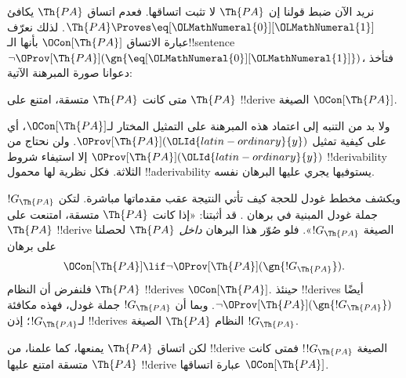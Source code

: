 \documentclass[../../../include/open-logic-section]{subfiles}
\begin{document}


نريد الآن ضبط قولنا إن $\Th{PA}$ لا تثبت اتساقها.
فعدم اتساق $\Th{PA}$ يكافئ $\Th{PA} \Proves \eq[\OLMathNumeral{0}][\OLMathNumeral{1}]$.
لذلك نعرّف عبارة الاتساق $\OCon[\Th{PA}]$ بأنها
الـ!!{sentence} $\lnot
\OProv[\Th{PA}](\gn{\eq[\OLMathNumeral{0}][\OLMathNumeral{1}]})$، فتأخذ دعوانا صورة المبرهنة
الآتية:

\begin{thm}
متى كانت $\Th{PA}$ متسقة، امتنع على $\Th{PA}$ !!{derive}
الصيغة $\OCon[\Th{PA}]$.
\end{thm}

ولا بد من التنبه إلى اعتماد هذه المبرهنة على التمثيل المختار
لـ$\OCon[\Th{PA}]$، أي على كيفية تمثيل $\OProv[\Th{PA}](\OLId{latin-ordinary}{y})$.
ولن نحتاج من $\OProv[\Th{PA}](\OLId{latin-ordinary}{y})$ إلا استيفاء شروط
!!{derivability} الثلاثة. فكل نظرية لها محمول
!!a{derivability} يستوفيها يجري عليها البرهان نفسه.

ويكشف مخطط غودل للحجة كيف تأتي النتيجة عقب مقدماتها مباشرة.
لتكن $!G_\Th{PA}$ جملة غودل المبنية في برهان
. قد أثبتنا: «إذا كانت
$\Th{PA}$ متسقة، امتنعت على $\Th{PA}$ !!{derive} الصيغة
$!G_\Th{PA}$». فلو صُوّر هذا البرهان \emph{داخل} $\Th{PA}$
لحصلنا على برهان
\[
\OCon[\Th{PA}] \lif \lnot \OProv[\Th{PA}](\gn{!G_\Th{PA}}).
\]
فلنفرض أن النظام $\Th{PA}$ !!{derive}s $\OCon[\Th{PA}]$.
حينئذ !!{derive}s أيضًا $\lnot \OProv[\Th{PA}](\gn{!G_\Th{PA}})$.
وبما أن $!G_\Th{PA}$ جملة غودل، فهذه مكافئة لـ$!G_\Th{PA}$؛
إذن !!{derive}s النظام $\Th{PA}$ الصيغة $!G_\Th{PA}$.

لكن اتساق $\Th{PA}$ يمنعها، كما علمنا، من !!{derive}
الصيغة $!G_\Th{PA}$!{} فمتى كانت $\Th{PA}$ متسقة امتنع
عليها !!{derive} عبارة اتساقها $\OCon[\Th{PA}]$.
\end{document}
